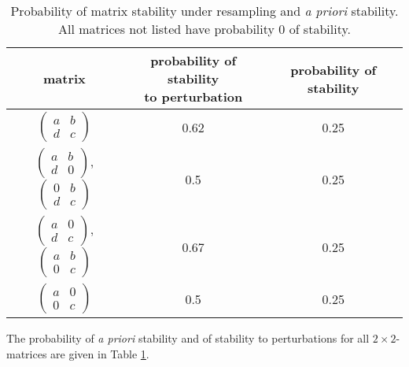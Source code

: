 \documentclass{amsart}
\theoremstyle{definition}
\theoremstyle{remark}
\numberwithin{equation}{section}
\begin{document}
\begin{table}[h]
\begin{tabular}{ c || c | c }
\hline
matrix & \specialcell{probability of stability\\to perturbation} & probability of stability\\
\hline
  $\begin{pmatrix}
a & b \\
d & c
\end{pmatrix}$ & 0.62 & 0.25 \\
  $\begin{pmatrix}
a & b \\
d & 0
\end{pmatrix}$, $\begin{pmatrix}
0 & b \\
d & c
\end{pmatrix}$ & 0.5 & 0.25 \\
  $\begin{pmatrix}
a & 0 \\
d & c
\end{pmatrix}$, $\begin{pmatrix}
a & b \\
0 & c
\end{pmatrix}$ & 0.67 & 0.25 \\
$\begin{pmatrix}
a & 0 \\
0 & c
\end{pmatrix}$ & 0.5 & 0.25 \\
\end{tabular}
\caption{Probability of matrix stability under resampling and \emph{a priori} stability. All matrices not listed have probability $0$ of stability.}\label{tab:structstabmat}
\end{table}

The probability of \emph{a priori} stability and of stability to perturbations for all $2 \times 2$-matrices are given in Table \ref{tab:structstabmat}.


\end{document}
